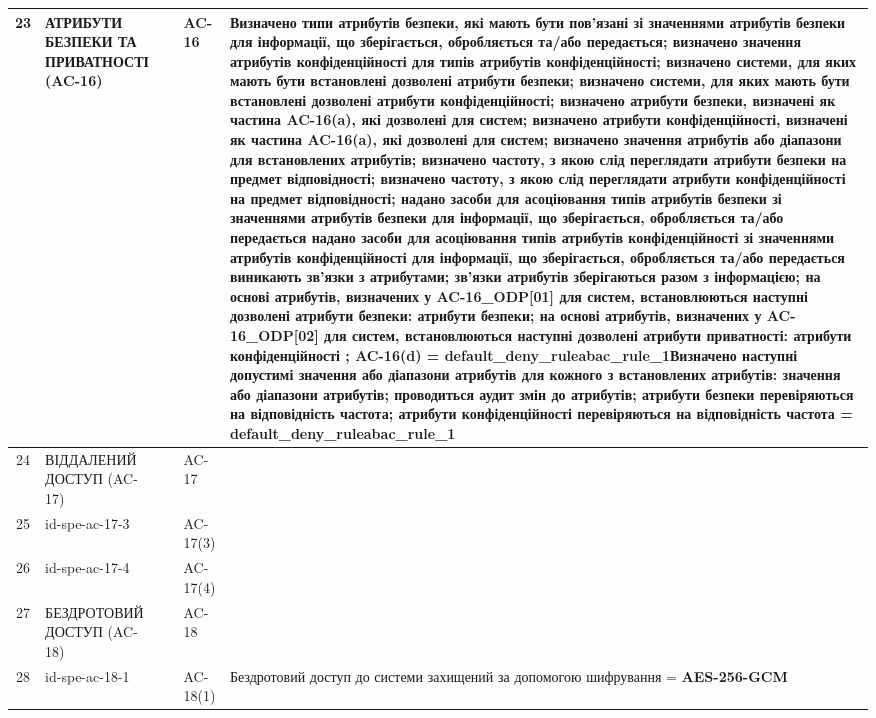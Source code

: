 \documentclass[10pt]{article}
\begin{document}
\begin{longtable}{|c|>{\raggedright\arraybackslash}p{4cm}|>{\raggedright\arraybackslash}p{2.5cm}|>{\raggedright\arraybackslash}p{3.5cm}|>{\raggedright\arraybackslash}p{5.5cm}|}
23 & АТРИБУТИ БЕЗПЕКИ ТА ПРИВАТНОСТІ (AC-16) &  & AC-16 & Визначено типи атрибутів безпеки, які мають бути пов'язані зі значеннями атрибутів безпеки для інформації, що зберігається, обробляється та/або передається; визначено значення атрибутів конфіденційності для типів атрибутів конфіденційності; визначено системи, для яких мають бути встановлені дозволені атрибути безпеки; визначено системи, для яких мають бути встановлені дозволені атрибути конфіденційності; визначено атрибути безпеки, визначені як частина AC-16(a), які дозволені для систем; визначено атрибути конфіденційності, визначені як частина AC-16(a), які дозволені для систем; визначено значення атрибутів або діапазони для встановлених атрибутів; визначено частоту, з якою слід переглядати атрибути безпеки на предмет відповідності; визначено частоту, з якою слід переглядати атрибути конфіденційності на предмет відповідності; надано засоби для асоціювання типів атрибутів безпеки зі значеннями атрибутів безпеки для інформації, що зберігається, обробляється та/або передається надано засоби для асоціювання типів атрибутів конфіденційності зі значеннями атрибутів конфіденційності для інформації, що зберігається, обробляється та/або передається виникають зв'язки з атрибутами; зв'язки атрибутів зберігаються разом з інформацією; на основі атрибутів, визначених у AC-16\_\allowbreak{}ODP[01] для систем, встановлюються наступні дозволені атрибути безпеки: атрибути безпеки; на основі атрибутів, визначених у AC-16\_\allowbreak{}ODP[02] для систем, встановлюються наступні дозволені атрибути приватності: атрибути конфіденційності ; AC-16(d) = \textbf{default\_\allowbreak{}deny\_\allowbreak{}ruleabac\_\allowbreak{}rule\_\allowbreak{}1}\newline Визначено наступні допустимі значення або діапазони атрибутів для кожного з встановлених атрибутів: значення або діапазони атрибутів; проводиться аудит змін до атрибутів; атрибути безпеки перевіряються на відповідність частота; атрибути конфіденційності перевіряються на відповідність частота = \textbf{default\_\allowbreak{}deny\_\allowbreak{}ruleabac\_\allowbreak{}rule\_\allowbreak{}1} \\ \hline
24 & ВІДДАЛЕНИЙ ДОСТУП (AC-17) &  & AC-17 &  \\ \hline
25 & id-spe-ac-17-3 &  & AC-17(3) &  \\ \hline
26 & id-spe-ac-17-4 &  & AC-17(4) &  \\ \hline
27 & БЕЗДРОТОВИЙ ДОСТУП (AC-18) &  & AC-18 &  \\ \hline
28 & id-spe-ac-18-1 &  & AC-18(1) & Бездротовий доступ до системи захищений за допомогою шифрування = \textbf{AES-256-GCM} \\ \hline

\end{longtable}
\end{document}
